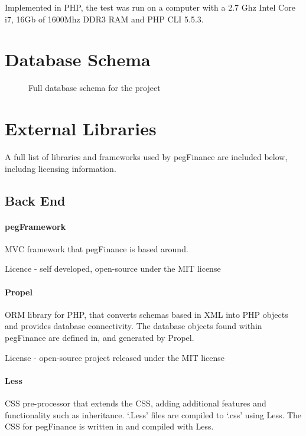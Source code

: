 \begin{appendices}
Implemented in PHP, the test was run on a computer with a 2.7 Ghz Intel Core i7, 16Gb of 1600Mhz DDR3 RAM and PHP CLI 5.5.3.



\chapter{Database Schema} \label{cha:databaseschema}

\begin{figure}[p]
    \vspace*{-2cm}
    \caption{Full database schema for the project}
\end{figure}

\chapter{External Libraries} \label{app:externallibraries}

A full list of libraries and frameworks used by pegFinance are included below, includng licensing information.

\section{Back End}
\subsubsection{pegFramework}
MVC framework that pegFinance is based around. 

Licence - self developed, open-source under the MIT license

\subsubsection{Propel}
ORM library for PHP, that converts schemas based in XML into PHP objects and provides database connectivity.
%
The database objects found within pegFinance are defined in, and generated by Propel. 

License - open-source project released under the MIT license

\subsubsection{Less}
CSS pre-processor that extends the CSS, adding additional features and functionality such as inheritance. `.Less' files are compiled to `.css' using Less.
%
The CSS for pegFinance is written in and compiled with Less.


\end{appendices}
